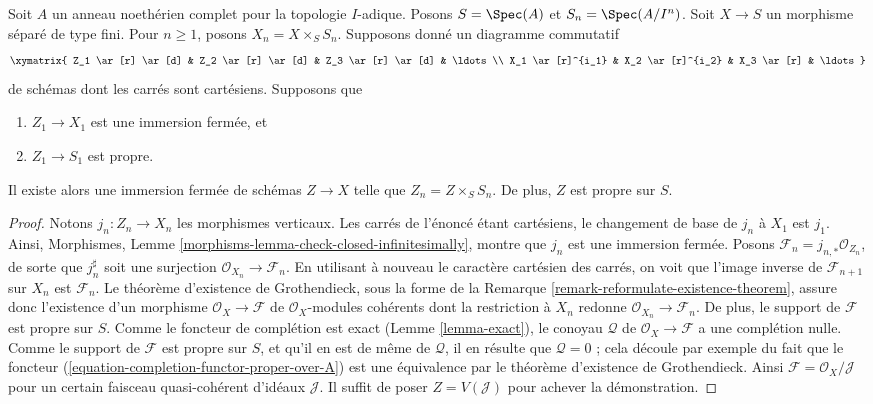 \begin{lemma}
\label{lemma-algebraize-formal-closed-subscheme}
Soit $A$ un anneau noethérien complet pour la topologie $I$-adique.
Posons $S = \Spec(A)$ et $S_n = \Spec(A/I^n)$.
Soit $X \to S$ un morphisme séparé de type fini.
Pour $n \geq 1$, posons $X_n = X \times_S S_n$.
Supposons donné un diagramme commutatif
$$
\xymatrix{
Z_1 \ar[r] \ar[d] & Z_2 \ar[r] \ar[d] & Z_3 \ar[r] \ar[d] & \ldots \\
X_1 \ar[r]^{i_1} & X_2 \ar[r]^{i_2} & X_3 \ar[r] & \ldots
}
$$
de schémas dont les carrés sont cartésiens. Supposons que
\begin{enumerate}
\item $Z_1 \to X_1$ est une immersion fermée, et
\item $Z_1 \to S_1$ est propre.
\end{enumerate}
Il existe alors une immersion fermée de schémas $Z \to X$ telle que
$Z_n = Z \times_S S_n$. De plus, $Z$ est propre sur $S$.
\end{lemma}

\begin{proof}
Notons $j_n : Z_n \to X_n$ les morphismes verticaux.
Les carrés de l'énoncé étant cartésiens, le changement de base de $j_n$ à
$X_1$ est $j_1$. Ainsi, Morphismes, Lemme
\ref{morphisms-lemma-check-closed-infinitesimally}, montre que $j_n$ est une
immersion fermée. Posons
$\mathcal{F}_n = j_{n, *}\mathcal{O}_{Z_n}$, de sorte que $j_n^\sharp$ soit
une surjection $\mathcal{O}_{X_n} \to \mathcal{F}_n$. En utilisant à nouveau
le caractère cartésien des carrés, on voit que l'image inverse de
$\mathcal{F}_{n + 1}$ sur $X_n$ est $\mathcal{F}_n$. Le théorème d'existence
de Grothendieck, sous la forme de la Remarque
\ref{remark-reformulate-existence-theorem}, assure donc l'existence d'un
morphisme
$\mathcal{O}_X \to \mathcal{F}$
de $\mathcal{O}_X$-modules cohérents dont la restriction à $X_n$ redonne
$\mathcal{O}_{X_n} \to \mathcal{F}_n$. De plus, le support de $\mathcal{F}$
est propre sur $S$. Comme le foncteur de complétion est exact (Lemme
\ref{lemma-exact}), le conoyau $\mathcal{Q}$ de
$\mathcal{O}_X \to \mathcal{F}$ a une complétion nulle. Comme le support de
$\mathcal{F}$ est propre sur $S$, et qu'il en est de même de $\mathcal{Q}$,
il en résulte que $\mathcal{Q} = 0$ ; cela découle par exemple du fait que le
foncteur (\ref{equation-completion-functor-proper-over-A}) est une équivalence
par le théorème d'existence de Grothendieck. Ainsi
$\mathcal{F} = \mathcal{O}_X/\mathcal{J}$ pour un certain faisceau
quasi-cohérent d'idéaux $\mathcal{J}$. Il suffit de poser
$Z = V(\mathcal{J})$ pour achever la démonstration.
\end{proof}

